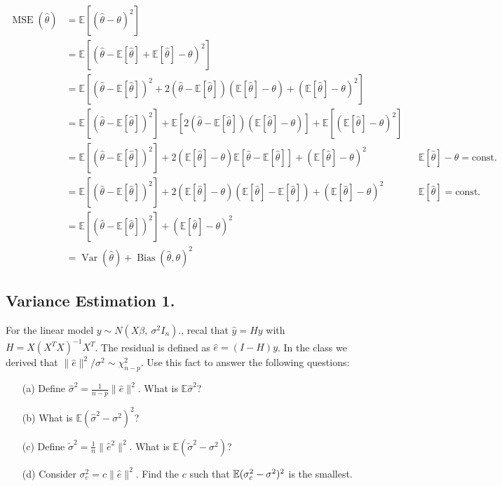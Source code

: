 \documentclass{tufte-book}
\begin{document}
\begin{align*}
\operatorname{MSE}(\hat{\theta}) &= \mathbb{E} \left [(\hat{\theta}-\theta)^2 \right ] \\
&=  \mathbb{E}\left[\left(\hat{\theta}-\mathbb{E} [\hat\theta]+\mathbb{E}[\hat\theta]-\theta\right)^2\right]\\
&= \mathbb{E}\left[\left(\hat{\theta}-\mathbb{E}[\hat\theta]\right)^2 +2\left (\hat{\theta}-\mathbb{E}[\hat\theta] \right ) \left (\mathbb{E}[\hat\theta]-\theta \right )+\left( \mathbb{E}[\hat\theta]-\theta \right)^2\right] \\
&= \mathbb{E}\left[\left(\hat{\theta}-\mathbb{E}[\hat\theta]\right)^2\right]+\mathbb{E}\left[2 \left (\hat{\theta}-\mathbb{E}[\hat\theta] \right ) \left (\mathbb{E}[\hat\theta]-\theta \right ) \right] + \mathbb{E}\left [ \left(\mathbb{E}[\hat\theta]-\theta\right)^2 \right] \\
&=  \mathbb{E}\left[\left(\hat{\theta}-\mathbb{E}[\hat\theta]\right)^2\right]+ 2 \left(\mathbb{E}[\hat\theta]-\theta\right) \mathbb{E}\left[\hat{\theta}-\mathbb{E}[\hat\theta] \right] +  \left(\mathbb{E}[\hat\theta]-\theta\right)^2 && \mathbb{E}[\hat\theta]-\theta = \text{const.} \\
&=  \mathbb{E}\left[\left(\hat{\theta}-\mathbb{E}[\hat\theta]\right)^2\right]+ 2 \left(\mathbb{E}[\hat\theta]-\theta\right) \left ( \mathbb{E}[\hat{\theta}]-\mathbb{E}[\hat\theta] \right )+  \left(\mathbb{E}[\hat\theta]-\theta\right)^2 && \mathbb{E}[\hat\theta] = \text{const.} \\
&= \mathbb{E}\left[\left(\hat{\theta}-\mathbb{E}[\hat\theta]\right)^2\right]+\left(\mathbb{E}[\hat\theta]-\theta\right)^2\\
&= \operatorname{Var}(\hat\theta)+ \operatorname{Bias}(\hat\theta,\theta)^2
\end{align*}


\subsection{Variance Estimation 1.} For the linear model $y \sim N(X\beta, \ \sigma^2I_n)$., recal that $\hat{y}=Hy$ with $H=X(X^TX)^{-1}X^T$.  The residual is defined as $\hat{e}=(I-H)y$.  In the class we derived that $\|\hat{e}\|^2/\sigma^2 \sim \chi_{n-p}^2$.  Use this fact to answer the following questions:

\begin{enumerate}
\item[(a)] Define $\hat{\sigma}^2 = \frac{1}{n-p}\|\hat{e}\|^2$. What is $\mathbb{E}\hat{\sigma}^2$?

\item[(b)] What is $\mathbb{E}(\hat{\sigma}^2-\sigma^2)^2$?

\item[(c)] Define $\tilde{\sigma}^2= \frac{1}{n}\|\hat{e}^2\|^2$.  What is $\mathbb{E}(\tilde{\sigma}^2 - \sigma^2)$?

\item[(d)] Consider $\sigma_c^2 = c\|\hat{e}\|^2$.  Find the $c$ such that $\operatorname{\mathbb{E}}(\sigma_c^2-\sigma^2)^2$ is the smallest.
\end{enumerate}
\end{document}
